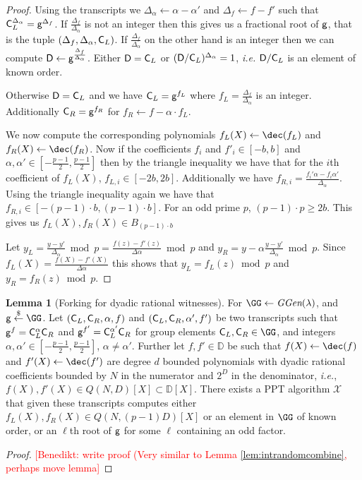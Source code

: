 \documentclass{article}
\theoremstyle{definition}
\newtheorem{lemma}{Lemma}
\newcommand{\benedikt}[1]{{\textcolor{red}{[Benedikt: #1]}}}
\newcommand{\benedikt}[1]{}
\begin{document}
\begin{proof}
	Using the transcripts we $\Delta_\alpha\gets\alpha-\alpha'$ and $\Delta_f\gets f-f'$ such that $\mathsf{C}_{L}^{\Delta_\alpha}=\mathsf{g}^{\Delta_f}$. 
 If $\frac{\Delta_f}{\Delta_\alpha}$ is not an integer then this gives us a fractional root of $\mathsf{g}$, that is the tuple $(\Delta_f,\Delta_\alpha,\mathsf{C}_{L})$.  
 If $\frac{\Delta_f}{\Delta_\alpha}$ on the other hand is an integer then we can compute $\mathsf{D}\gets\mathsf{g}^{\frac{\Delta_f}{\Delta_\alpha}}$. Either $\mathsf{D}=\mathsf{C}_{L}$ or $(\mathsf{D}/\mathsf{C}_{L})^{\Delta_\alpha}=1$, \emph{i.e.} $\mathsf{D}/\mathsf{C}_{L}$ is an element of known order.
   
  Otherwise $\mathsf{D} = \mathsf{C}_L$ and we have $\mathsf{C}_{L}=\mathsf{g}^{f_L}$ where $f_L=\frac{\Delta_f}{\Delta_\alpha}$ is an integer.
Additionally $\mathsf{C}_R=\mathsf{g}^{f_R}$ for $f_R\gets f-\alpha \cdot f_L$.

We now compute the corresponding polynomials $f_L(X)\gets \dec(f_L)$ and $f_R(X)\gets \dec(f_R)$.
Now if the coefficients $f_i$ and $f'_i\in [-b,b]$ and $\alpha,\alpha' \in [-\frac{p-1}{2},\frac{p-1}{2}]$ then by the triangle inequality we have that for the $i$th coefficient of $f_L(X)$, $f_{L,i}\in [-2b,2b]$. Additionally we have $f_{R,i}=\frac{f_i'\alpha-f_i \alpha'}{\Delta_\alpha}$. Using the triangle inequality again we have that $f_{R,i} \in [-(p-1) \cdot b, (p-1) \cdot b]$. For an odd prime $p$, $(p-1)\cdot p\geq 2b$. This gives us $f_L(X),f_R(X)\in B_{(p-1) \cdot b}$

Let $y_L=\frac{y-y'}{\Delta_\alpha} \bmod p=\frac{f(z)-f'(z)}{\Delta \alpha} \bmod p$ and $y_R= y-\alpha\frac{y-y'}{\Delta_\alpha} \bmod p$. Since $f_L(X)=\frac{f(X)-f'(X)}{\Delta \alpha}$ this shows that $y_L=f_L(z)\bmod p$ and $y_R=f_R(z)\bmod p$.
\end{proof}


\begin{lemma}[Forking for dyadic rational witnesses]
	For $\GG \gets \ggen(\lambda)$, and $\gr{g}\sample \GG$. 
	Let $(\mathsf{C}_L,\mathsf{C}_R,\alpha,f)$ and  $(\mathsf{C}_L,\mathsf{C}_R,\alpha',f')$ be two transcripts such that $\mathsf{g}^{f}=\mathsf{C}_L^{\alpha}\mathsf{C}_R$ and $\mathsf{g}^{f'}=\mathsf{C}_L^{\alpha'}\mathsf{C}_R$ for group elements $\gr{C}_L,\gr{C}_R \in \GG$, and integers $\alpha,\alpha' \in  [-\frac{p-1}{2},\frac{p-1}{2}]$, $\alpha\neq \alpha'$. Further let $f,f'\in \mathbb{D}$ be such that $f(X)\gets\dec(f)$ and $f'(X)\gets\dec(f')$ are degree $d$ bounded polynomials with dyadic rational coefficients bounded by $N$ in the numerator and $2^D$ in the denominator, \emph{i.e.}, $f(X),f'(X)\in Q(N, D)[X]\subset \mathbb{D}[X]$.
	 There exists a PPT algorithm $\mathcal{X}$ that given these transcripts computes either $f_L(X),f_R(X)\in Q(N, (p-1)D)[X]$ or an element in $\GG$ of known order, or an $\ell$th root of $\mathsf{g}$ for some $\ell$ containing an odd factor.
\end{lemma}
\begin{proof}
\benedikt{write proof (Very similar to Lemma \ref{lem:intrandomcombine}, perhaps move lemma}
	
\end{proof}
\end{document}
